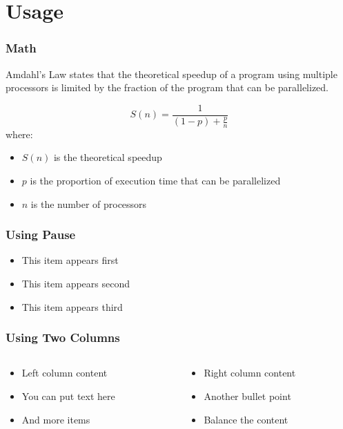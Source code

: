 \section{Usage}

\begin{frame}
    \frametitle{Math}
    \begin{definition}
        Amdahl's Law states that the theoretical speedup of a program using multiple processors is limited by the fraction of the program that can be parallelized.
    \end{definition}
    \begin{equation}
        S(n) = \frac{1}{(1-p) + \frac{p}{n}}
    \end{equation}
    where:
    \begin{itemize}
        \item $S(n)$ is the theoretical speedup
        \item $p$ is the proportion of execution time that can be parallelized
        \item $n$ is the number of processors
    \end{itemize}
\end{frame}

\begin{frame}
    \frametitle{Using Pause}
    \begin{itemize}
        \item This item appears first \pause
        \item This item appears second \pause
        \item This item appears third
    \end{itemize}
\end{frame}

\begin{frame}
    \frametitle{Using Two Columns}
    \begin{columns}[t]
        \begin{column}{0.45\textwidth}
            \begin{itemize}
                \item Left column content
                \item You can put text here
                \item And more items
            \end{itemize}
        \end{column}
        \begin{column}{0.45\textwidth}
            \begin{itemize}
                \item Right column content 
                \item Another bullet point
                \item Balance the content
            \end{itemize}
        \end{column}
    \end{columns}
\end{frame}


